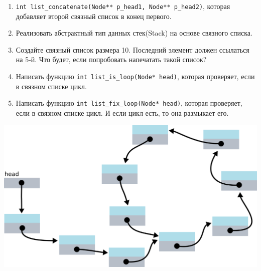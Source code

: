\documentclass{article}
\begin{document}
\begin{enumerate}
\item \texttt{int list\_concatenate(Node** p\_head1, Node** p\_head2)}, которая добавляет второй связный список в конец первого.

\item Реализовать абстрактный тип данных стек(Stack) на основе связного списка. 

\item Создайте связный список размера 10. Последний элемент должен ссылаться на 5-й. Что будет, если попробовать напечатать такой список?

\item Написать функцию \texttt{int list\_is\_loop(Node* head)}, которая проверяет, если в связном списке цикл.

\item Написать функцию \texttt{int list\_fix\_loop(Node* head)}, которая проверяет, если в связном списке цикл. И если цикл есть, то она размыкает его.
\end{enumerate}
\begin{center}
\includegraphics[scale=0.77]{../images/list_loop_2.png}
\end{center}
\end{document}
